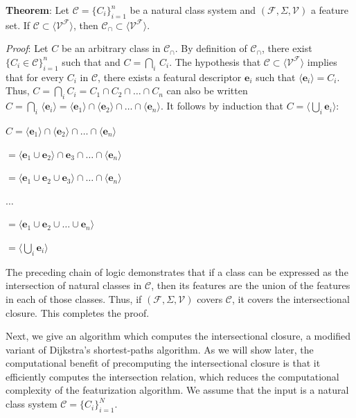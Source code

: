 \documentclass[11pt, oneside]{article}   	%
\begin{document}
\vspace{\baselineskip} \noindent \textbf{Theorem}: Let $\mathcal C = \{C_i\}_{i=1}^n$ be a natural class system and $(\mathcal F, \Sigma, \mathcal V)$ a feature set. If $\mathcal C \subset \langle \mathcal V^\mathcal F \rangle$, then $\mathcal C_\cap \subset\langle \mathcal V^\mathcal F \rangle $.

\textit{Proof}: Let $C$ be an arbitrary class in $\mathcal C_\cap$. By definition of $\mathcal C_\cap$, there exist $\{C_i \in \mathcal C\}_{i=1}^n$ such that and $C = \bigcap_i \, C_i$. The hypothesis that $\mathcal C \subset \langle \mathcal V^\mathcal F \rangle $ implies that for every $C_i$ in $\mathcal C$, there exists a featural descriptor $\mathbf{e}_i$ such that $\langle \mathbf{e}_i \rangle = C_i$. Thus, $C = \bigcap_i C_i = C_1 \cap C_2 \cap \ldots \cap C_n$ can also be written $C = \bigcap_i \, \langle \mathbf{e}_i \rangle = \langle \mathbf{e}_1 \rangle \cap  \langle \mathbf{e}_2 \rangle \cap \ldots \cap  \langle \mathbf{e}_n \rangle$. It follows by induction that $C = \langle \bigcup_i  \mathbf{e}_i \rangle$:

$C = \langle \mathbf{e}_1 \rangle \cap  \langle \mathbf{e}_2 \rangle \cap \ldots \cap  \langle \mathbf{e}_n \rangle$

\quad $ = \langle \mathbf{e}_1 \cup \mathbf{e}_2 \rangle \cap \mathbf{e}_3 \cap \ldots \cap \langle \mathbf{e}_n \rangle$

\quad $ = \langle \mathbf{e}_1 \cup \mathbf{e}_2 \cup \mathbf{e}_3 \rangle \cap \ldots \cap \langle \mathbf{e}_n \rangle$

\quad $\ldots$

\quad $= \langle \mathbf{e}_1 \cup \mathbf{e}_2 \cup \ldots \cup \mathbf{e}_n \rangle$

\quad $= \langle \bigcup_i  \mathbf{e}_i \rangle$

\noindent The preceding chain of logic demonstrates that if a class can be expressed as the intersection of natural classes in $\mathcal C$, then its features are the union of the features in each of those classes. Thus, if $(\mathcal F, \Sigma, \mathcal V)$ covers $\mathcal C$, it covers the intersectional closure. This completes the proof.


\vspace{\baselineskip} Next, we give an algorithm which computes the intersectional closure, a modified variant of Dijkstra's shortest-paths algorithm. As we will show later, the computational benefit of precomputing the intersectional closure is that it efficiently computes the intersection relation, which reduces the computational complexity of the featurization algorithm. We assume that the input is a natural class system $\mathcal C = \{C_i\}_{i=1}^N$.
\end{document}
